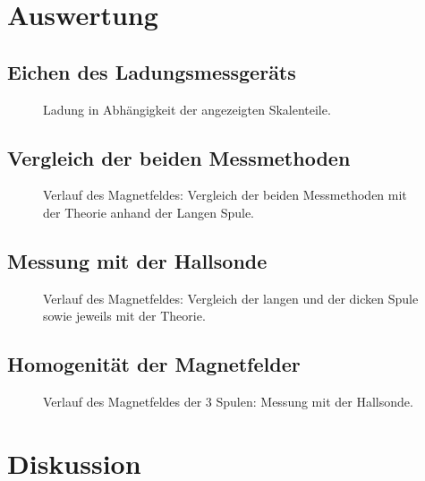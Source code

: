 \documentclass[12pt,a4paper,titlepage,headinclude,bibtotoc]{scrartcl}
\begin{document}
\section{Auswertung}
\label{sec:auswertung}
\subsection{Eichen des Ladungsmessgeräts}
\begin{figure}[!htb]
	\centering
	
	\caption{Ladung in Abhängigkeit der angezeigten Skalenteile.}
	\label{fig:Eichen}
\end{figure}

\subsection{Vergleich der beiden Messmethoden}
\begin{figure}[!htb]
	\centering
	
	\caption{Verlauf des Magnetfeldes: Vergleich der beiden Messmethoden mit der Theorie anhand der Langen Spule.}
	\label{fig:LangIndHall}
\end{figure}
\subsection{Messung mit der Hallsonde}
\begin{figure}[!htb]
	\centering
	
	\caption{Verlauf des Magnetfeldes: Vergleich der langen und der dicken Spule sowie jeweils mit der Theorie.}
	\label{fig:HallVergleich}
\end{figure}
\subsection{Homogenität der Magnetfelder}
\begin{figure}[!htb]
	\centering
	
	\caption{Verlauf des Magnetfeldes der 3 Spulen: Messung mit der Hallsonde.}
	\label{fig:Homogen}
\end{figure}


\section{Diskussion}
\label{sec:diskussion}



\end{document}
